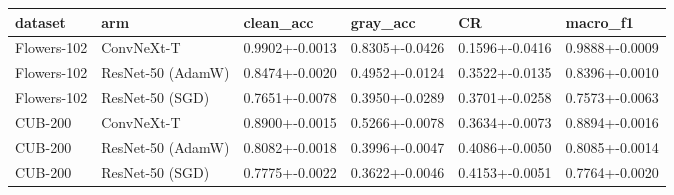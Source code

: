 \begin{tabular}{llllll}
\toprule
dataset & arm & clean_acc & gray_acc & CR & macro_f1 \\
\midrule
Flowers-102 & ConvNeXt-T & 0.9902+-0.0013 & 0.8305+-0.0426 & 0.1596+-0.0416 & 0.9888+-0.0009 \\
Flowers-102 & ResNet-50 (AdamW) & 0.8474+-0.0020 & 0.4952+-0.0124 & 0.3522+-0.0135 & 0.8396+-0.0010 \\
Flowers-102 & ResNet-50 (SGD) & 0.7651+-0.0078 & 0.3950+-0.0289 & 0.3701+-0.0258 & 0.7573+-0.0063 \\
CUB-200 & ConvNeXt-T & 0.8900+-0.0015 & 0.5266+-0.0078 & 0.3634+-0.0073 & 0.8894+-0.0016 \\
CUB-200 & ResNet-50 (AdamW) & 0.8082+-0.0018 & 0.3996+-0.0047 & 0.4086+-0.0050 & 0.8085+-0.0014 \\
CUB-200 & ResNet-50 (SGD) & 0.7775+-0.0022 & 0.3622+-0.0046 & 0.4153+-0.0051 & 0.7764+-0.0020 \\
\bottomrule
\end{tabular}
